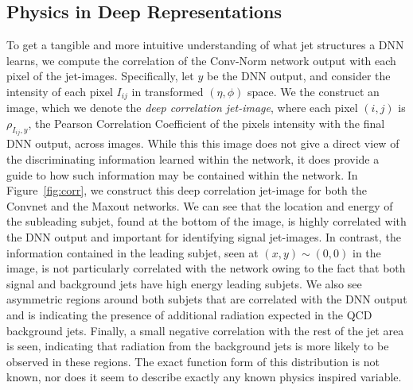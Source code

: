 \subsection{Physics in Deep Representations} %
\label{ssub:physics_in_deep_representations}
To get a tangible and more intuitive understanding of what jet structures a DNN learns, we compute the correlation of the Conv-Norm network output with each pixel of the jet-images. Specifically, let $y$ be the DNN output, and consider the intensity of each pixel $I_{ij}$ in transformed $(\eta, \phi)$ space. We the construct an image, which we denote the \emph{deep correlation jet-image}, where each pixel $(i, j)$ is $\rho_{I_{ij}, y}$, the Pearson Correlation Coefficient of the pixels intensity with the final DNN output, across images. While this this image does not give a direct view of the discriminating information learned within the network, it does provide a guide to how such information may be contained within the network.  In Figure~\ref{fig:corr}, we construct this deep correlation jet-image for both the Convnet and the Maxout networks.  We can see that the location and energy of the subleading subjet, found at the bottom of the image, is highly correlated with the DNN output and important for identifying signal jet-images.  In contrast, the information contained in the leading subjet, seen at $(x,y)\sim (0,0)$ in the image, is not particularly correlated with the network owing to the fact that both signal and background jets have high energy leading subjets.  We also see asymmetric regions around both subjets that are correlated with the DNN output and is indicating the presence of additional radiation expected in the QCD background jets.  Finally, a small negative correlation with the rest of the jet area is seen, indicating that radiation from the background jets is more likely to be observed in these regions.   The exact function form of this distribution is not known, nor does it seem to describe exactly any known physics inspired variable.
